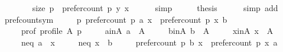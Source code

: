 \begin{isabellebody}
\ \isamarkupfalse%
\isanewline
\ \ \ \ {\isachardoublequoteopen}{\isachardot}{\kern0pt}{\isachardot}{\kern0pt}{\isachardot}{\kern0pt}\ {\isacharequal}{\kern0pt}\ size\ p\ {\isacharminus}{\kern0pt}\ {\isacharparenleft}{\kern0pt}prefer{\isacharunderscore}{\kern0pt}count\ p\ y\ x{\isacharparenright}{\kern0pt}{\isachardoublequoteclose}\isanewline
\ \ \ \ \isamarkupfalse%
\ simp\isanewline
\ \ \isamarkupfalse%
\ \isamarkupfalse%
\ {\isacharquery}{\kern0pt}thesis\isanewline
\ \ \ \ \isamarkupfalse%
\ {\isacharparenleft}{\kern0pt}simp\ add{\isacharcolon}{\kern0pt}\ {\isachardoublequoteopen}{}{}{\isachardoublequoteclose}\ {\isachardoublequoteopen}{}{}{\isachardoublequoteclose}{\isacharparenright}{\kern0pt}\isanewline
{}\isamarkupfalse%
%
\endisatagproof
{\isafoldproof}%
%
\isadelimproof
\isanewline
%
\endisadelimproof
\isanewline
{}\isamarkupfalse%
\ pref{\isacharunderscore}{\kern0pt}count{\isacharunderscore}{\kern0pt}sym{\isacharcolon}{\kern0pt}\isanewline
\ \ \ \ \ p{}{\isacharcolon}{\kern0pt}\ {\isachardoublequoteopen}prefer{\isacharunderscore}{\kern0pt}count\ p\ a\ x\ {\isasymge}\ prefer{\isacharunderscore}{\kern0pt}count\ p\ x\ b{\isachardoublequoteclose}\isanewline
\ \ \ \ \ prof{\isacharcolon}{\kern0pt}\ {\isachardoublequoteopen}profile\ A\ p{\isachardoublequoteclose}\isanewline
\ \ \ \ \ a{\isacharunderscore}{\kern0pt}in{\isacharunderscore}{\kern0pt}A{\isacharcolon}{\kern0pt}\ {\isachardoublequoteopen}a\ {\isasymin}\ A{\isachardoublequoteclose}\isanewline
\ \ \ \ \ b{\isacharunderscore}{\kern0pt}in{\isacharunderscore}{\kern0pt}A{\isacharcolon}{\kern0pt}\ {\isachardoublequoteopen}b\ {\isasymin}\ A{\isachardoublequoteclose}\isanewline
\ \ \ \ \ x{\isacharunderscore}{\kern0pt}in{\isacharunderscore}{\kern0pt}A{\isacharcolon}{\kern0pt}\ {\isachardoublequoteopen}x\ {\isasymin}\ A{\isachardoublequoteclose}\isanewline
\ \ \ \ \ neq{}{\isacharcolon}{\kern0pt}\ {\isachardoublequoteopen}a\ {\isasymnoteq}\ x{\isachardoublequoteclose}\isanewline
\ \ \ \ \ neq{}{\isacharcolon}{\kern0pt}\ {\isachardoublequoteopen}x\ {\isasymnoteq}\ b{\isachardoublequoteclose}\isanewline
\ \ \ \ \ {\isachardoublequoteopen}prefer{\isacharunderscore}{\kern0pt}count\ p\ b\ x\ {\isasymge}\ prefer{\isacharunderscore}{\kern0pt}count\ p\ x\ a{\isachardoublequoteclose}\isanewline

\end{isabellebody}
